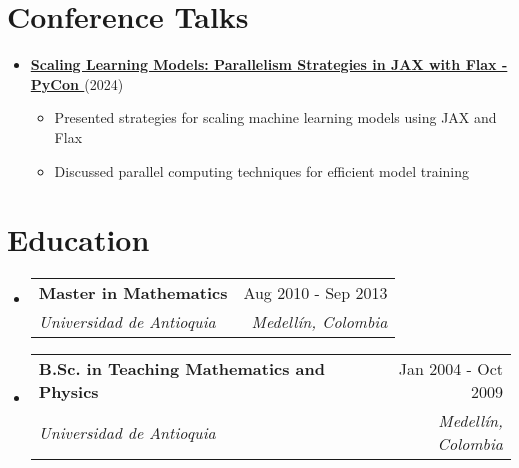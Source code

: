 \documentclass[letterpaper,11pt]{article}
\makeatletter
\newcommand{\resumeSubheading}[4]{
  \vspace{-2pt}
  \item[]
  \begin{tabular*}{\textwidth}{@{\extracolsep{\fill}}l r}
    \textbf{#1} & #2 \\
    \textit{#3} & \textit{#4} \\
  \end{tabular*}
  \vspace{-5pt}
}
\newcommand{\normalfaYoutube}{{\mdseries\faYoutube}}
\makeatother
\begin{document}
\section{Conference Talks}
\begin{itemize}[leftmargin=*]
    \item \textbf{\href{https://www.youtube.com/watch?v=m4hP1soE414}{Scaling Learning Models: Parallelism Strategies in JAX with Flax - PyCon \normalfaYoutube}} (2024)
    \begin{itemize}
        \item Presented strategies for scaling machine learning models using JAX and Flax
        \item Discussed parallel computing techniques for efficient model training
    \end{itemize}
\end{itemize}

\section{Education}
\begin{itemize}[leftmargin=0pt, itemindent=0pt, label={}]
\resumeSubheading
{Master in Mathematics}{Aug 2010 - Sep 2013}
{Universidad de Antioquia}{Medellín, Colombia}

\resumeSubheading
{B.Sc. in Teaching Mathematics and Physics}{Jan 2004 - Oct 2009}
{Universidad de Antioquia}{Medellín, Colombia}
\end{itemize}
\end{document}
